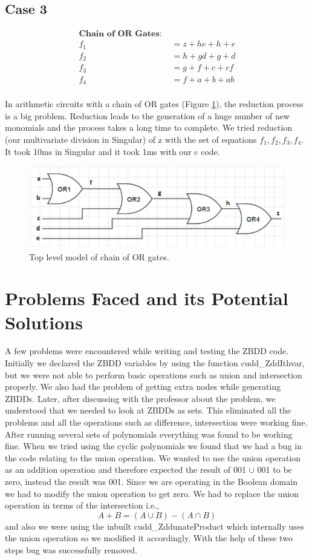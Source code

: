 \documentclass[letterpaper, 10 pt, conference]{ieeeconf}
\begin{document}
\subsection{Case 3}
\label{sec:case3}
\begin{align*}
\textbf{Chain of OR Gates: } \\
f_{1} &= z+he+h+e \\
f_{2} &= h+gd+g+d \\
f_{3} &= g+f+c+cf \\
f_{4} &= f+a+b+ab \\
\end{align*}

In arithmetic circuits with a chain of OR gates (Figure \ref{fig:case3}), the reduction process is a big problem.  Reduction leads to the generation of a huge number of new monomials and the process takes a long time to complete.  We tried reduction (our multivariate division in Singular) of z with the set of equations $f_{1},f_{2},f_{3},f_{4}$. It took 10ms in Singular and it took 1ms with our c code.

\begin{figure}[b]\centering
\includegraphics[scale=.6]{case3}
\caption{Top level model of chain of OR gates.}
\label{fig:case3}
\end{figure}

\section{Problems Faced and its Potential Solutions}
\label{sec:problems}
A few problems were encountered while writing and testing the ZBDD code.  Initially we declared the ZBDD variables by using the function cudd\_ZddIthvar, but we were not able to perform basic operations such as union and intersection properly. We also had the problem of getting extra nodes while generating ZBDDs.  Later, after discussing with the professor about the problem, we understood that we needed to look at ZBDDs as sets. This eliminated all the problems and all the operations such as difference, intersection were working fine.  After running several sets of polynomials everything was found to be working fine. When we tried using the cyclic polynomials we found that we had a bug in the code relating to the union operation. We wanted to use the union operation as an addition operation and therefore expected the result of 001 $\cup$ 001 to be zero, instead the result was 001. Since we are operating in the Boolean domain we had to modify the union operation to get zero. We had to replace the union operation in terms of the intersection i.e., $$ A + B = (A \cup B)-(A \cap B)$$ and also we were using the inbuilt cudd\_ZddunateProduct which internally uses the union operation so we modified it accordingly. With the help of these two steps bug was successfully removed.
\end{document}
